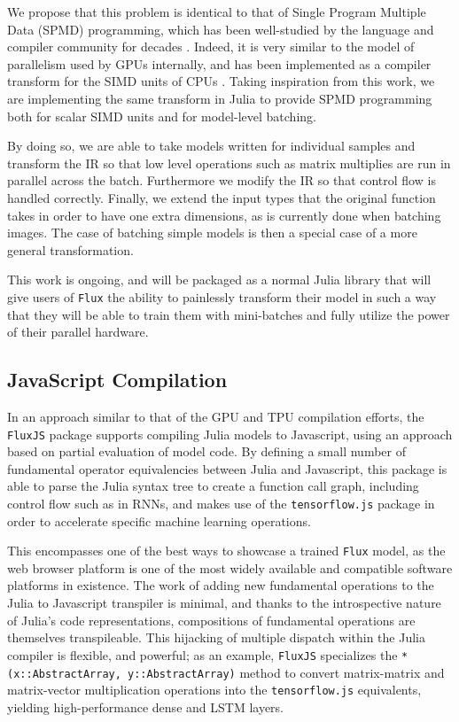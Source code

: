 \documentclass{juliacon}
\begin{document}
We propose that this problem is identical to that of Single Program Multiple Data (SPMD) programming, which has been well-studied by the language and compiler community for decades \cite{blelloch1990vector, Allen:1983:CCD:567067.567085}. Indeed, it is very similar to the model of parallelism used by GPUs internally, and has been implemented as a compiler transform for the SIMD units of CPUs \cite{Pharr2012ispcAS}. Taking inspiration from this work, we are implementing the same transform \cite{hack2011whole} in Julia to provide SPMD programming both for scalar SIMD units and for model-level batching.

By doing so, we are able to take models written for individual samples and transform the IR so that low level operations such as matrix multiplies are run in parallel across the batch. Furthermore we modify the IR so that control flow is handled correctly. Finally, we extend the input types that the original function takes in order to have one extra dimensions, as is currently done when batching images.  The case of batching simple models is then a special case of a more general transformation.

This work is ongoing, and will be packaged as a normal Julia library that will give users of \texttt{Flux} the ability to painlessly transform their model in such a way that they will be able to train them with mini-batches and fully utilize the power of their parallel hardware.

\subsection{JavaScript Compilation}

In an approach similar to that of the GPU and TPU compilation efforts, the \texttt{FluxJS} package \cite{FluxJS.jl} supports compiling Julia models to Javascript, using an approach based on partial evaluation of model code.  By defining a small number of fundamental operator equivalencies between Julia and Javascript, this package is able to parse the Julia syntax tree to create a function call graph, including control flow such as in RNNs, and makes use of the \texttt{tensorflow.js} \cite{tensorflow.js} package in order to accelerate specific machine learning operations.

This encompasses one of the best ways to showcase a trained \texttt{Flux} model, as the web browser platform is one of the most widely available and compatible software platforms in existence.  The work of adding new fundamental operations to the Julia to Javascript transpiler is minimal, and thanks to the introspective nature of Julia's code representations, compositions of fundamental operations are themselves transpileable.  This hijacking of multiple dispatch within the Julia compiler is flexible, and powerful; as an example, \texttt{FluxJS} specializes the \texttt{*(x::AbstractArray, y::AbstractArray)} method to convert matrix-matrix and matrix-vector multiplication operations into the \texttt{tensorflow.js} equivalents, yielding high-performance dense and LSTM layers.
\end{document}
